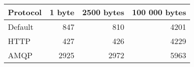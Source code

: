 \begin{tabularx}{\textwidth}{lrrr}
\hline
 Protocol   &   1 byte &   2500 bytes &   100 000 bytes \\
\hline
 Default    &      847 &          810 &            4201 \\
 HTTP       &      427 &          426 &            4229 \\
 AMQP       &     2925 &         2972 &            5963 \\
\hline
\end{tabularx}